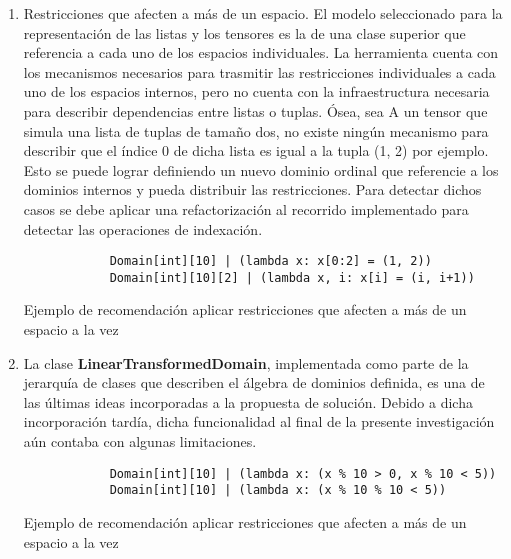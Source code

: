 \begin{recomendations}
\begin{enumerate}
        \item   Restricciones que afecten a más de un espacio. El modelo seleccionado para la representación
              de las listas y los tensores es la de una clase superior que referencia a cada uno de los espacios
              individuales. La herramienta cuenta con los mecanismos necesarios para trasmitir las restricciones
              individuales a cada uno de los espacios internos, pero no cuenta con la infraestructura necesaria
              para describir dependencias entre listas o tuplas. Ósea, sea A un tensor que simula una lista de
              tuplas de tamaño dos, no existe ningún mecanismo para describir que el índice 0 de dicha lista es
              igual a la tupla (1, 2) por ejemplo. Esto se puede lograr definiendo un nuevo dominio ordinal que
              referencie a los dominios internos y pueda distribuir las restricciones. Para detectar dichos casos
              se debe aplicar una refactorización al recorrido implementado para detectar las operaciones de
              indexación.
      \begin{listing}[!ht]
            \begin{verbatim}
            Domain[int][10] | (lambda x: x[0:2] = (1, 2))
            Domain[int][10][2] | (lambda x, i: x[i] = (i, i+1))
            \end{verbatim}
            \label{nada}
            \caption{Ejemplo de recomendación aplicar restricciones que afecten a más de un espacio a la vez}
      \end{listing}
      \newpage
      \item La clase {\bf LinearTransformedDomain}, implementada como parte de la jerarquía de clases que describen 
      el álgebra de dominios definida, es una de las últimas ideas incorporadas a la propuesta de solución. Debido a 
      dicha incorporación tardía, dicha funcionalidad al final de la presente investigación aún contaba con algunas
      limitaciones. 
      
      \begin{listing}[!ht]
            \begin{verbatim}
            Domain[int][10] | (lambda x: (x % 10 > 0, x % 10 < 5))
            Domain[int][10] | (lambda x: (x % 10 % 10 < 5))
            \end{verbatim}
            \caption{Ejemplo de recomendación aplicar restricciones que afecten a más de un espacio a la vez}
            \label{rec:mod}
      \end{listing}


\end{enumerate}
\end{recomendations}
